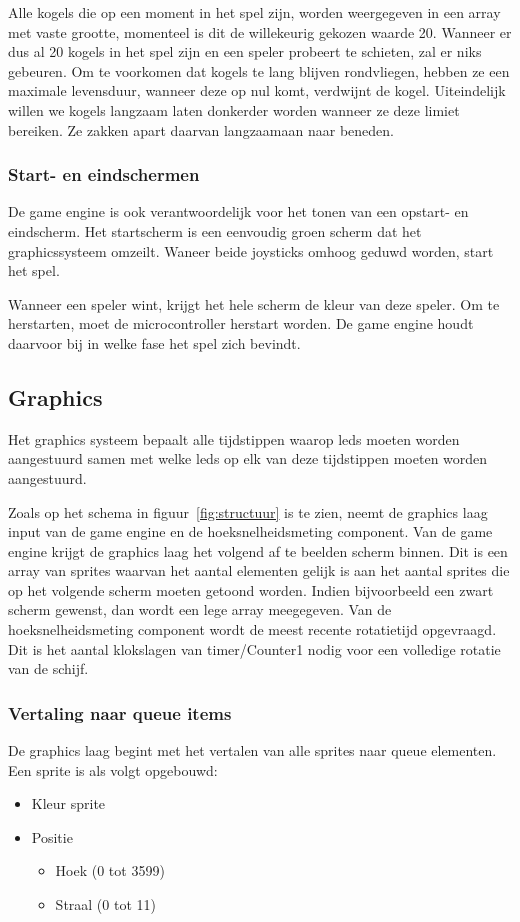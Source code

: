 \documentclass[12pt]{ugentreport}
\begin{document}
Alle kogels die op een moment in het spel zijn, worden weergegeven in een array
met vaste grootte, momenteel is dit de willekeurig gekozen waarde 20. Wanneer
er dus al 20 kogels in het spel zijn en een speler probeert te schieten, zal er
niks gebeuren. Om te voorkomen
dat kogels te lang blijven rondvliegen, hebben ze een maximale levensduur,
wanneer deze op nul komt, verdwijnt de kogel. Uiteindelijk willen we kogels
langzaam laten donkerder worden wanneer ze deze limiet bereiken. Ze zakken apart
daarvan langzaamaan naar beneden.

\subsubsection{Start- en eindschermen}
De game engine is ook verantwoordelijk voor het tonen van een opstart- en
eindscherm. Het startscherm is een eenvoudig groen scherm dat het
graphicssysteem omzeilt. Waneer beide joysticks omhoog geduwd worden, start het
spel.

Wanneer een speler wint, krijgt het hele scherm de kleur van deze speler. Om te
herstarten, moet de microcontroller herstart worden. De game engine houdt
daarvoor bij in welke fase het spel zich bevindt.

\subsection{Graphics}
Het graphics systeem bepaalt alle tijdstippen waarop leds moeten worden aangestuurd samen met welke leds op elk van deze tijdstippen moeten worden aangestuurd.

Zoals op het schema in figuur~\ref{fig:structuur} is te zien, neemt de graphics laag input van de game engine en de hoeksnelheidsmeting component.
Van de game engine krijgt de graphics laag het volgend af te beelden scherm binnen. Dit is een array van sprites waarvan het aantal
elementen gelijk is aan het aantal sprites die op het volgende scherm moeten getoond worden. Indien bijvoorbeeld een zwart scherm
gewenst, dan wordt een lege array meegegeven. Van de hoeksnelheidsmeting component wordt de meest recente rotatietijd opgevraagd.
Dit is het aantal klokslagen van timer/Counter1 nodig voor een volledige rotatie van de schijf.

\subsubsection{Vertaling naar queue items}
De graphics laag begint met het vertalen van alle sprites naar queue elementen.
Een sprite is als volgt opgebouwd:
\begin{itemize}
	\item Kleur sprite
	\item Positie
	\begin{itemize}
		\item Hoek (0 tot 3599)
		\item Straal (0 tot 11)
	\end{itemize}
\end{itemize}
\end{document}
